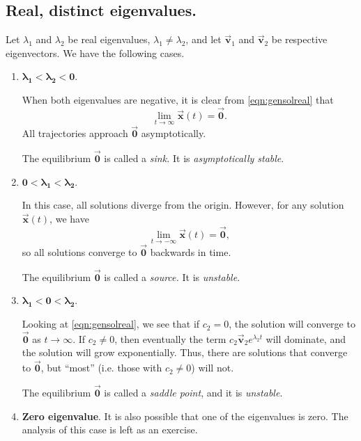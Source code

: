 \documentclass[reqno]{immbook}
\newcommand{\BV}{\vec{\textbf{v}}}
\newcommand{\BX}{\vec{\textbf{x}}}
\newcommand{\BZero}{\vec{\textbf{0}}}  %
\numberwithin{equation}{chapter}
\numberwithin{question}{section}
\numberwithin{theorem}{chapter}
\numberwithin{figure}{chapter}
\theoremstyle{definition}
\begin{document}
\subsection*{Real, distinct eigenvalues.}
Let $\lambda_1$ and $\lambda_2$ be real eigenvalues,
$\lambda_1\ne\lambda_2$, and let $\BV_1$ and $\BV_2$
be respective eigenvectors.  We have the following
cases.
\begin{enumerate}
\item $\pmb{\lambda_1 < \lambda_2 < 0}$.

\noindent
When both eigenvalues are negative, it is clear from
\eqref{eqn:gensolreal}
that
\[
  \lim_{t\rightarrow\infty}\BX(t) = \BZero.
\]
All trajectories approach $\BZero$ asymptotically.

\noindent
The equilibrium $\BZero$ is called a \emph{sink.}
It is \emph{asymptotically stable}.

\smallskip

\item $\pmb{0 < \lambda_1 < \lambda _2}$.

\noindent
In this case, all solutions diverge from the origin.
However, for any solution $\BX(t)$, we have
\[
  \lim_{t\rightarrow -\infty}\BX(t) = \BZero,
\]
so all solutions 
converge to $\BZero$ backwards in time.

\noindent
The equilibrium $\BZero$ is called a \emph{source.}
It is \emph{unstable}.

\smallskip

\item $\pmb{\lambda_1 < 0 < \lambda_2}$.

\noindent
Looking at \eqref{eqn:gensolreal}, we see that if $c_2=0$, the solution
will converge to $\BZero$ as $t\rightarrow\infty$.
If $c_2\ne 0$, then eventually the term $c_2\BV_2e^{\lambda_2 t}$ will
dominate, and the solution will grow exponentially.
Thus, there are solutions that converge to $\BZero$, but ``most''
(i.e. those with $c_2\ne 0$) will not.

\noindent
The equilibrium $\BZero$ is called a \emph{saddle point}, 
and it is \emph{unstable}.

\smallskip

\item \textbf{Zero eigenvalue}.  It is also possible that
one of the eigenvalues is zero.  The analysis
of this case is left as an exercise.
\end{enumerate}
\end{document}
